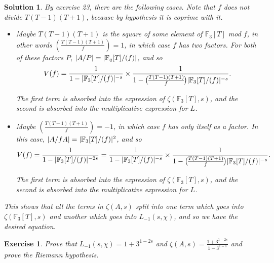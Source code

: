 \documentclass{article}
\newtheorem{ex}{Exercise}
\theoremstyle{nonumberplain}
\newtheorem{sol}{Solution}
\newcommand{\FF}{\mathbb{F}}
\DeclarePairedDelimiter{\abs}{\lvert}{\rvert}
\newcommand{\legendre}[2]{\genfrac{(}{)}{}{}{#1}{#2}}
\begin{document}
\begin{sol}
By exercise 23, there are the following cases. Note that $f$ does not divide $T(T-1)(T+1)$, because by hypothesis it is coprime with it.
\begin{itemize}
\item Maybe $T(T-1)(T+1)$ is the square of some element of $\FF_3[T]$ mod $f$, in other words $\legendre{T(T-1)(T+1)}f = 1$, in which case $f$ has two factors. For both of these factors $P$, $\abs{A/P} = \abs{\FF_q[T]/(f)}$, and so
\begin{equation}
V(f) = \frac1{1-\abs{\FF_3[T]/(f)}^{-s}} \times \frac1{1- \legendre{T(T-1)(T+1)}f \abs{\FF_3[T]/(f)}^{-s}}.
\end{equation}

The first term is absorbed into the expression of $\zeta(\FF_3[T],s)$, and the second is absorbed into the multiplicative expression for $L$.

\item Maybe $\legendre{T(T-1)(T+1)}f = -1$, in which case $f$ has only itself as a factor. In this case, $\abs{A/fA} = \abs{\FF_3[T]/(f)}^2$, and so
\begin{equation}
V(f) = \frac1{1-\abs{\FF_3[T]/(f)}^{-2s}} = \frac1{1-\abs{\FF_3[T]/(f)}^{-s}} \times \frac1{1- \legendre{T(T-1)(T+1)}f\abs{\FF_3[T]/(f)}^{-s}}.
\end{equation}

The first term is absorbed into the expression of $\zeta(\FF_3[T],s)$, and the second is absorbed into the multiplicative expression for $L$.
\end{itemize}

This shows that all the terms in $\zeta(A,s)$ split into one term which goes into $\zeta(\FF_3[T],s)$ and another which goes into $L_{-1}(s,\chi)$, and so we have the desired equation.
\end{sol}

\begin{ex}
Prove that $L_{-1}(s,\chi) = 1 + 3^{1-2s}$ and $\zeta(A,s) = \frac{1+ 3^{1-2s}}{1-3^{1-s}}$ and prove the Riemann hypothesis.
\end{ex}
\end{document}
